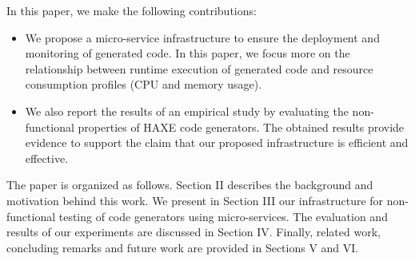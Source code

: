 In this paper, we make the following contributions:
\begin{itemize} 	
	
	\item We propose a micro-service infrastructure to ensure the deployment and monitoring of generated code. In this paper, we focus more on the relationship between runtime execution of generated code and resource consumption profiles (CPU and memory usage).
	\item We also report the results of an empirical study by evaluating the non-functional properties of HAXE code generators. The obtained results provide evidence to support the claim that our proposed infrastructure is efficient and effective.	
\end{itemize}

The paper is organized as follows.
Section II describes the background and motivation behind this work. We present in Section III our infrastructure for non-functional testing of code generators using micro-services. 
The evaluation and results of our experiments are discussed in Section IV. 
Finally, related work, concluding remarks and future work are provided in Sections V and VI.














